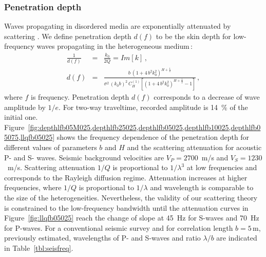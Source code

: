 \subsubsection{Penetration depth}


Waves propagating in disordered media are exponentially 
attenuated by scattering \cite[]{Odoherty_A71,White_SN90}.
We define penetration depth $d(f)$ to be the skin depth \cite[]{Vanderbaan_WS07}
for low-frequency waves propagating in the heterogeneous medium\,:
\begin{eqnarray}
\frac{1}{d(f)} & = & \frac{k_0}{2Q} = Im[k]\,,\\
d(f) & = & \frac{b~(1+4\,b^2k_0^2)^{H+\frac{1}{2}}}
{\sigma^2\,(k_0b)^2\,C^{(1)}_{H}\left[(1+4\,b^2k_0^2)^{H+\frac{1}{2}}-1\right]}\,, \label{eqn:penedep}
\end{eqnarray}
where $f$ is frequency.
Penetration depth $d(f)$ corresponds to a decrease of wave amplitude by $1/e$.
For two-way traveltime, recorded amplitude is 14~\% of the initial one.
Figure~\ref{fig:depthlfb05M025,depthlfb25025,depthlfb05025,depthlfb10025,depthlfb05075,llqfb05025}
shows the frequency dependence of the penetration depth for different values of parameters $b$ and $H$
and the scattering attenuation for acoustic P- and S- waves.
Seismic background velocities are $V_P=2700$~m/s and $V_S=1230$~m/s.
Scattering attenuation $1/Q$ is proportional to $1/\lambda^3$
at low frequencies and corresponds to the Rayleigh diffusion regime.
Attenuation increases at higher frequencies, where $1/Q$ is proportional to $1/\lambda$
and wavelength is comparable to the size of the heterogeneities.
Nevertheless, the validity of our scattering theory is constrained to 
the low-frequency bandwidth until the attenuation curves in Figure~\ref{fig:llqfb05025}
reach the change of slope at 45~Hz for S-waves and 70~Hz for P-waves.
For a conventional seismic survey and for correlation length $b=5$\,m, previously estimated,
wavelengths of P- and S-waves and ratio $\lambda/b$ are indicated in Table~\ref{tbl:seisfreq}.

